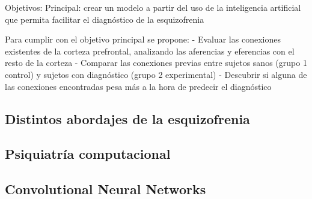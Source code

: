Objetivos:
Principal: crear un modelo a partir del uso de la inteligencia artificial que permita facilitar el diagnóstico de la esquizofrenia 

Para cumplir con el objetivo principal se propone:
- Evaluar las conexiones existentes de la corteza prefrontal, analizando las aferencias y eferencias con el resto de la corteza
- Comparar las conexiones previas entre sujetos sanos (grupo 1 control) y sujetos con diagnóstico (grupo 2 experimental)
- Descubrir si alguna de las conexiones encontradas pesa más a la hora de predecir el diagnóstico
\subsection{Distintos abordajes de la esquizofrenia}

\subsection{Psiquiatría computacional}

\subsection{Convolutional Neural Networks}